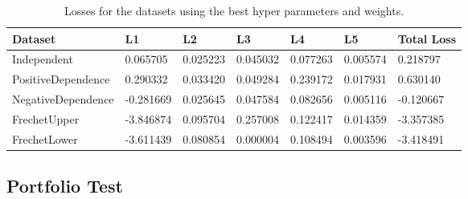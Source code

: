     
\begin{table}[h!]
    \centering
    \caption{Losses for the datasets using the best hyper parameters and weights.}

    \begin{tabular}{lllllll}
        \textbf{Dataset} & \textbf{L1}& \textbf{L2}& \textbf{L3}& \textbf{L4}& \textbf{L5}& \textbf{Total Loss} \\
        \midrule
        Independent & 0.065705 & 0.025223 & 0.045032 & 0.077263 & 0.005574 & 0.218797 \\
        PositiveDependence & 0.290332 & 0.033420 & 0.049284 & 0.239172 & 0.017931 & 0.630140 \\
        NegativeDependence & -0.281669 & 0.025645 & 0.047584 & 0.082656 & 0.005116 & -0.120667 \\
        FrechetUpper & -3.846874 & 0.095704 & 0.257008 & 0.122417 & 0.014359 & -3.357385 \\
        FrechetLower & -3.611439 & 0.080854 & 0.000004 & 0.108494 & 0.003596 & -3.418491 \\
        \end{tabular}
    \label{tab:LossesBestParameters}
\end{table}






\subsection{Portfolio Test}



